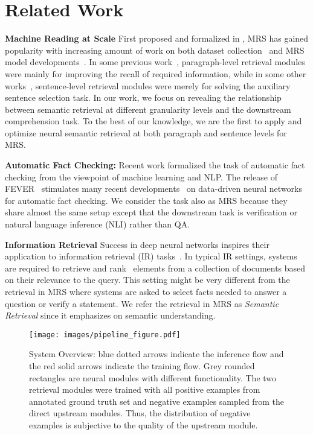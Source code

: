 \documentclass[11pt,a4paper]{article}
\newcommand\fever{FEVER\xspace}
\begin{document}
\section{Related Work}

\noindent\textbf{Machine Reading at Scale}
First proposed and formalized in , MRS has gained popularity with increasing amount of work on both dataset collection~\cite{Joshi2017trivia_qa, welbl2018constructing} and MRS model developments~\cite{wang2018r3, clark2017simple, htut2018training}. In some previous work~\cite{lee2018ranking}, paragraph-level retrieval modules were mainly for improving the recall of required information, while in some other works~\cite{yang2018hotpotqa}, sentence-level retrieval modules were merely for solving the auxiliary sentence selection task. In our work, we focus on revealing the relationship between semantic retrieval at different granularity levels and the downstream comprehension task. To the best of our knowledge, we are the first to apply and optimize neural semantic retrieval at both paragraph and sentence levels for MRS.

\noindent\textbf{Automatic Fact Checking:} Recent work \cite{thorne2018automated_survey} formalized the task of automatic fact checking from the viewpoint of machine learning and NLP. The release of \fever~\cite{Thorne18Fever} stimulates many recent developments~\cite{nie2019combining, yoneda2018ucl_2nd, hanselowski2018ukp_3rd} on data-driven neural networks for automatic fact checking. We consider the task also as MRS because they share almost the same setup except that the downstream task is verification or natural language inference (NLI) rather than QA.

\noindent\textbf{Information Retrieval}
Success in deep neural networks inspires their application to information retrieval (IR) tasks~\cite{huang2013learning,guo2016deep,mitra2017learning,dehghani2017neural}.
In typical IR settings, systems are required to retrieve and rank~\cite{nguyen2016ms_marco} elements from a collection of documents based on their relevance to the query. This setting might be very different from the retrieval in MRS where systems are asked to select facts needed to answer a question or verify a statement. We refer the retrieval in MRS as \textit{Semantic Retrieval} since it emphasizes on semantic understanding.


\begin{figure*}[t]
\centering
\texttt{[image: images/pipeline\_figure.pdf]}
\vspace{-7pt}
\caption{System Overview: blue dotted arrows indicate the inference flow and the red solid arrows indicate the training flow. Grey rounded rectangles are neural modules with different functionality. The two retrieval modules were trained with all positive examples from annotated ground truth set and negative examples sampled from the direct upstream modules. Thus, the distribution of negative examples is subjective to the quality of the upstream module.}
\label{fig:fig_system_overview}
\vspace{-10pt}
\end{figure*}
\end{document}
